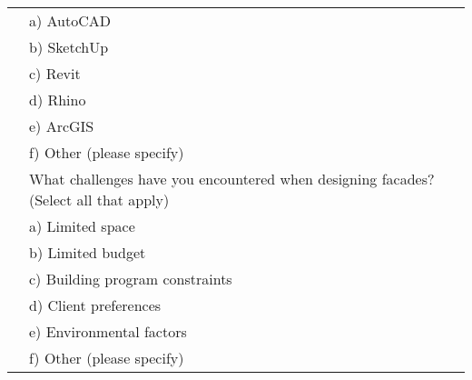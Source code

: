 \begin{table}[htb]
\begin{tabularx}{\linewidth}{p{0.125cm}X}
            & a) AutoCAD \\
            & b) SketchUp \\
            & c) Revit \\
            & d) Rhino \\
            & e) ArcGIS \\
            & f) Other (please specify) \\
            \addlinespace
            5 & What challenges have you encountered when designing facades? (Select all that apply) \\
            & a) Limited space \\
            & b) Limited budget \\
            & c) Building program constraints \\
            & d) Client preferences \\
            & e) Environmental factors \\
            & f) Other (please specify) \\

            \bottomrule

        \end{tabularx}
    \end{table}

